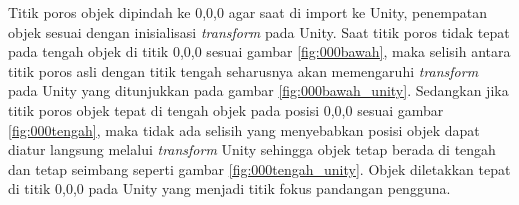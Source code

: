 			Titik poros objek dipindah ke 0,0,0 agar saat di import ke Unity, penempatan objek sesuai dengan inisialisasi \textit{transform} pada Unity. Saat titik poros tidak tepat pada tengah objek di titik 0,0,0 sesuai gambar \ref{fig:000bawah}, maka selisih antara titik poros asli dengan titik tengah seharusnya akan memengaruhi \textit{transform} pada Unity yang ditunjukkan pada gambar \ref{fig:000bawah_unity}. Sedangkan jika titik poros objek tepat di tengah objek pada posisi 0,0,0 sesuai gambar \ref{fig:000tengah}, maka tidak ada selisih yang menyebabkan posisi objek dapat diatur langsung melalui \textit{transform} Unity sehingga objek tetap berada di tengah dan tetap seimbang seperti gambar  \ref{fig:000tengah_unity}. Objek diletakkan tepat di titik 0,0,0 pada Unity yang menjadi titik fokus pandangan pengguna.
		\vspace{0.75ex}
		
